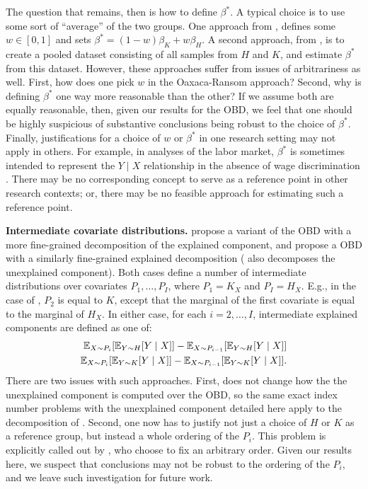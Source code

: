 The question that remains, then is how to define $\beta^*$.
A typical choice is to use some sort of ``average'' of the two groups.
One approach from \citet{oaxacaRansom1998}, defines some $w \in [0,1]$ and sets $\beta^* = (1-w)\beta_K + w\beta_H$.
A second approach, from \citet{neumark1988}, is to create a pooled dataset consisting of all samples from $H$ and $K$, and estimate $\beta^*$ from this dataset.
However, these approaches suffer from issues of arbitrariness as well.
First, how does one pick $w$ in the Oaxaca-Ransom approach?
Second, why is defining $\beta^*$ one way more reasonable than the other?
If we assume both are equally reasonable, then, given our results for the OBD, we feel that one should be highly suspicious of substantive conclusions being robust to the choice of $\beta^*$.
Finally, justifications for a choice of $w$ or $\beta^*$ in one research setting may not apply in others.
For example, in analyses of the labor market, $\beta^*$ is sometimes intended to represent the $Y \mid X$ relationship in the absence of wage discrimination \citep{neumark1988}. 
There may be no corresponding concept to serve as a reference point in other research contexts; or, there may be no feasible approach for estimating such a reference point.

\textbf{Intermediate covariate distributions.}
\citet{dinardoFortinLemieux1996} propose a variant of the OBD with a more fine-grained decomposition of the explained component, and \citet{quintero2025} propose a OBD with a similarly fine-grained explained decomposition (\citet{quintero2025} also decomposes the unexplained component).
Both cases define a number of intermediate distributions over covariates $P_1, \dots, P_I$, where $P_1 = K_X$ and $P_I = H_X$. E.g., in the case of \citet{quintero2025}, $P_2$ is equal to $K$, except that the marginal of the first covariate is equal to the marginal of $H_X$.
In either case, for each $i = 2, \dots, I$, intermediate explained components are defined as one of:
\begin{align}
  \mathbb{E}_{X \sim P_i}[ \mathbb{E}_{Y \sim H}[Y \mid X] ] - \mathbb{E}_{X \sim P_{i-1}} [ \mathbb{E}_{Y \sim H} [Y \mid X]] \\
  \mathbb{E}_{X \sim P_i}[ \mathbb{E}_{Y \sim K}[Y \mid X] ] - \mathbb{E}_{X \sim P_{i-1}} [ \mathbb{E}_{Y \sim K} [Y \mid X]].
\end{align}  
There are two issues with such approaches.
First, \citet{dinardoFortinLemieux1996} does not change how the the unexplained component is computed over the OBD, so the same exact index number problems with the unexplained component detailed here apply to the decomposition of \citet{dinardoFortinLemieux1996}.
Second, one now has to justify not just a choice of $H$ or $K$ as a reference group, but instead a whole ordering of the $P_i$.
This problem is explicitly called out by \citet{quintero2025}, who choose to fix an arbitrary order.
Given our results here, we suspect that conclusions may not be robust to the ordering of the $P_i$, and we leave such investigation for future work.
